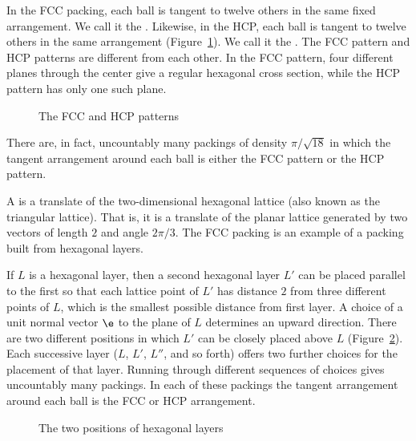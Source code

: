 In the FCC packing, each ball is tangent to twelve others in the same fixed
arrangement.  We call it the .  Likewise, in the
HCP, each ball is tangent to twelve others in
the same arrangement  (Figure~\ref{fig:hcp}).  We call it the .  The FCC
pattern and HCP patterns are different from each other.  In the FCC
pattern, four different planes through the center give a regular
hexagonal cross section, while the HCP pattern has only one such
plane.   

\begin{figure}[htb]
  \centering
  \caption{The FCC and HCP patterns}
  \label{fig:hcp}
\end{figure}

There are, in fact, uncountably many packings of density $\pi/\sqrt{18}$ in which
the tangent arrangement around each ball is either the FCC
pattern or the HCP pattern.

A  is a translate of the
two-dimensional hexagonal lattice (also known as the triangular
lattice). That is, it is a translate of the planar lattice generated
by two vectors of length $2$ and angle $2\pi/3$.  The FCC
 packing is an example of a packing built from hexagonal layers.

 If $L$ is a hexagonal layer, then a second hexagonal layer $L'$ can be
 placed parallel to the first so that each lattice point of $L'$ has
 distance $2$ from three different points of $L$,
 which is the smallest possible distance from first layer.  A choice
 of a unit normal vector $\e$ to the plane of $L$ determines an upward
 direction.  There are two different positions in which $L'$ can be
 closely placed above $L$
(Figure~\ref{fig:two-holes}).  Each successive layer 
  ($L$, $L'$, $L''$, and so
 forth) offers two further choices  for the placement of
 that layer. Running through different 
 sequences of choices gives uncountably many packings.  In each of
 these packings the tangent arrangement around each ball is the FCC or HCP arrangement.

\begin{figure}[htb]
  \centering
  \caption{The two positions of hexagonal layers}
  \label{fig:two-holes}
\end{figure}

